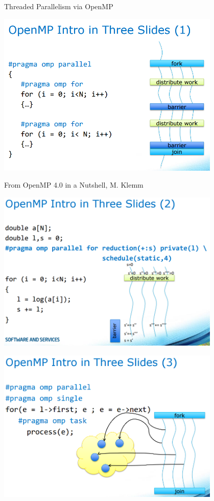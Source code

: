 \documentclass[10pt]{beamer}
\begin{document}
\begin{frame}[allowframebreaks]{Threaded Parallelism via OpenMP}

\includegraphics[width=0.8\textwidth]{omp1.png}

{\tiny From OpenMP 4.0 in a Nutshell, M. Klemm}


\includegraphics[width=0.8\textwidth]{omp2.png}


\includegraphics[width=0.8\textwidth]{omp3.png}

\end{frame}
\end{document}
